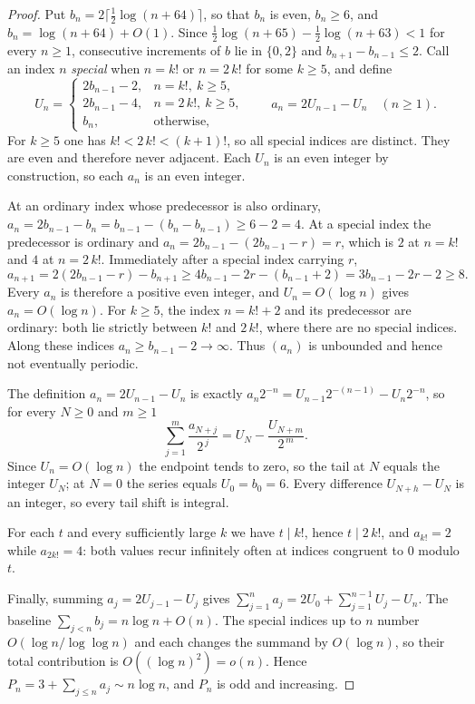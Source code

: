 \begin{proof}
Put $b_n=2\lceil\tfrac12\log(n+64)\rceil$, so
that $b_n$ is even, $b_n\ge6$, and $b_n=\log(n+64)+O(1)$.  Since
$\tfrac12\log(n+65)-\tfrac12\log(n+63)<1$ for every $n\ge1$, consecutive
increments of $b$ lie in $\{0,2\}$ and $b_{n+1}-b_{n-1}\le2$.  Call an index
$n$ \emph{special} when $n=k!$ or $n=2\,k!$ for some $k\ge5$, and define
\[
 U_n=\begin{cases}
  2b_{n-1}-2,& n=k!,\ k\ge5,\\
  2b_{n-1}-4,& n=2\,k!,\ k\ge5,\\
  b_n,&\text{otherwise},
 \end{cases}
 \qquad a_n=2U_{n-1}-U_n\quad(n\ge1).
\]
For $k\ge5$ one has $k!<2\,k!<(k+1)!$, so all special indices are distinct.
They are even and therefore never adjacent.  Each $U_n$ is an even integer by construction, so
each $a_n$ is an even integer.

At an ordinary index whose predecessor is also ordinary,
$a_n=2b_{n-1}-b_n=b_{n-1}-(b_n-b_{n-1})\ge6-2=4$.  At a special index the
predecessor is ordinary and $a_n=2b_{n-1}-(2b_{n-1}-r)=r$, which is $2$ at
$n=k!$ and $4$ at $n=2\,k!$.  Immediately after a special index carrying $r$,
\[
 a_{n+1}=2(2b_{n-1}-r)-b_{n+1}\ge4b_{n-1}-2r-(b_{n-1}+2)
 =3b_{n-1}-2r-2\ge8 .
\]
Every $a_n$ is therefore a positive even integer, and $U_n=O(\log n)$ gives
$a_n=O(\log n)$.  For $k\ge5$, the index $n=k!+2$ and its predecessor are ordinary:
both lie strictly between $k!$ and $2\,k!$, where there are no special
indices.  Along these indices $a_n\ge b_{n-1}-2\to\infty$.
Thus $(a_n)$ is unbounded and hence not eventually periodic.

The definition $a_n=2U_{n-1}-U_n$ is exactly $a_n2^{-n}=U_{n-1}2^{-(n-1)}-U_n2^{-n}$,
so for every $N\ge0$ and $m\ge1$
\[
 \sum_{j=1}^{m}\frac{a_{N+j}}{2^{\,j}}=U_N-\frac{U_{N+m}}{2^{\,m}} .
\]
Since $U_n=O(\log n)$ the endpoint tends to zero, so the tail at $N$ equals the
integer $U_N$; at $N=0$ the series equals $U_0=b_0=6$.  Every difference
$U_{N+h}-U_N$ is an integer, so every tail shift is integral.

For each $t$ and every sufficiently large $k$ we have $t\mid k!$, hence
$t\mid2\,k!$, and $a_{k!}=2$ while $a_{2k!}=4$: both values recur infinitely
often at indices congruent to $0$ modulo $t$.

Finally, summing $a_j=2U_{j-1}-U_j$ gives
$\sum_{j=1}^{n}a_j=2U_0+\sum_{j=1}^{n-1}U_j-U_n$.  The baseline
$\sum_{j<n}b_j=n\log n+O(n)$.  The special indices up to $n$ number
$O(\log n/\log\log n)$ and each changes the summand by $O(\log n)$, so their
total contribution is $O((\log n)^2)=o(n)$.  Hence
$P_n=3+\sum_{j\le n}a_j\sim n\log n$, and $P_n$ is odd and increasing.
\end{proof}

